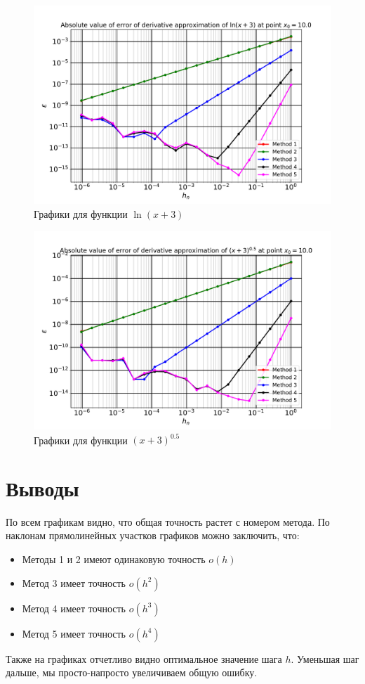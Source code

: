 		\newpage
		\begin{figure}[h!]
			\centering
			\includegraphics[width=\linewidth]{./Pictures/Function_4.pdf}
			\caption{Графики для функции $\ln(x + 3)$}
		\end{figure}
		
		\begin{figure}[h!]
			\centering
			\includegraphics[width=\linewidth]{./Pictures/Function_5.pdf}
			\caption{Графики для функции $(x + 3)^{0.5}$}
		\end{figure}
 		
 		
 		\section*{Выводы}
 		
 		По всем графикам видно, что общая точность растет с номером метода. По наклонам прямолинейных участков графиков можно заключить, что:
 		\begin{itemize}
 			\item Методы 1 и 2 имеют одинаковую точность $o(h)$
 			\item Метод 3 имеет точность $o(h^2)$
 			\item Метод 4 имеет точность $o(h^3)$
 			\item Метод 5 имеет точность $o(h^4)$
 		\end{itemize}
 	
 		Также на графиках отчетливо видно оптимальное значение шага $h$. Уменьшая шаг дальше, мы просто-напросто увеличиваем общую ошибку.
 		
